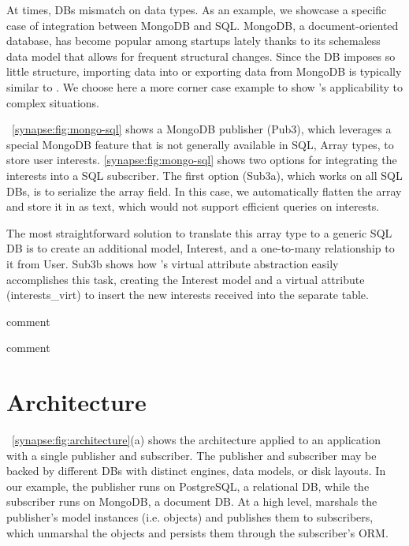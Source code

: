 At times, DBs mismatch on data types.  As an example, we showcase a specific
case of integration between MongoDB and SQL.
MongoDB, a document-oriented database, has become popular among startups
lately thanks to its schemaless data model that allows for frequent
structural changes.  Since the DB imposes so little structure, importing data
into or exporting data from MongoDB is typically similar to
\label{synapse:fig:mongo-to-star}. We choose here a more corner case example to
show \synapse's applicability to complex situations.

\F~\ref{synapse:fig:mongo-sql} shows a MongoDB publisher (Pub3), which leverages a
special MongoDB feature that is not generally available in SQL,
Array types, to store user interests.  \F\ref{synapse:fig:mongo-sql} shows two options
for integrating the interests into a SQL subscriber.  The first option (Sub3a),
which works on all SQL DBs, is to serialize the array field.
In this case, we automatically flatten the array and store it in as text, which would not support efficient queries on interests.

The most straightforward solution to translate this array type to a generic SQL DB is to create an additional model, {\code \footnotesize Interest}, and a one-to-many relationship to it from {\code \footnotesize User}.
Sub3b shows how \synapse's virtual attribute abstraction easily accomplishes
this task, creating the {\code \footnotesize Interest} model and a virtual
attribute  ({\code \footnotesize interests\_virt}) to insert the new interests
received into the separate table.

   comment

   comment
\section{\synapse Architecture}
\label{synapse:sec:arch}

\F~\ref{synapse:fig:architecture}(a) shows the \synapse architecture applied to an
application with a single publisher and subscriber. The publisher and subscriber
may be backed by different DBs with distinct engines, data models, or disk
layouts. In our example, the publisher runs on PostgreSQL, a relational DB,
while the subscriber runs on MongoDB, a document DB. At a high level, \synapse
marshals the publisher's model instances (i.e. objects) and publishes them to
subscribers, which unmarshal the objects and persists them through the
subscriber's ORM.


